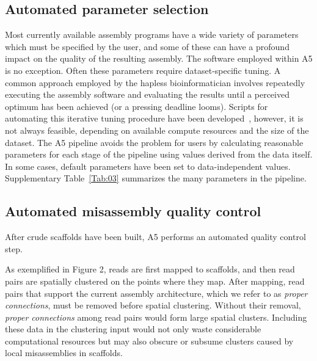 \documentclass{bioinfo}
\begin{document}
\subsection{Automated parameter selection}

Most currently available assembly programs have a wide variety of parameters which must
be specified by the user, and some of these can have a profound impact on the quality of the 
resulting assembly. The software employed within A5 is no exception. 
Often these parameters require dataset-specific tuning.  A common approach
employed by the hapless bioinformatician involves repeatedly
executing the assembly software and evaluating the results until a perceived 
optimum has been achieved (or a pressing deadline looms). Scripts for automating this iterative tuning procedure have 
been developed~\citep{VelveltOpt}, however, it is not always feasible, depending on available compute resources and the size 
of the dataset. The A5 pipeline avoids the problem for users by calculating reasonable
parameters for each stage of the pipeline using values derived from the data itself. In some
cases, default parameters have been set to data-independent values. Supplementary Table~\ref{Tab:03} 
summarizes the many parameters in the pipeline.

\subsection{Automated misassembly quality control}\label{sec:qc}

After crude scaffolds have been built, A5 performs an automated quality control step.

As exemplified in Figure 2, reads are first mapped to scaffolds, and then read pairs are spatially clustered on the
points where they map. After mapping, read pairs that support the current assembly architecture, which we 
refer to as \emph{proper connections}, must be removed before spatial clustering. Without their removal, \emph{proper connections}
among read pairs would form large spatial clusters. Including these data in the clustering input would not only waste considerable 
computational resources but may also obscure or subsume clusters caused by local misassemblies in scaffolds. 
\end{document}
